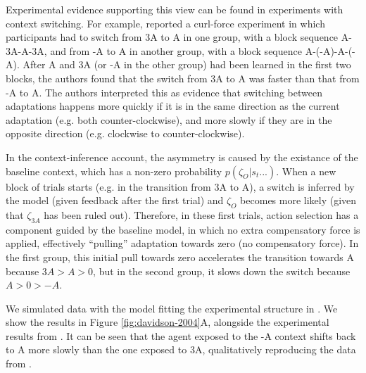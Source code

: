 \documentclass[a4paper,doc,floatsintext,natbib]{apa6}
\def \fref #1{Figure \ref{#1}}     %
\begin{document}
Experimental evidence supporting this view can be found in experiments with context switching. For example, \cite{Davidson_Scaling_2004} reported a curl-force experiment in which participants had to switch from 3A to A in one group, with a block sequence A-3A-A-3A, and from -A to A in another group, with a block sequence A-(-A)-A-(-A). After A and 3A (or -A in the other group) had been learned in the first two blocks, the authors found that the switch from 3A to A was faster than that from -A to A. The authors interpreted this as evidence that switching between adaptations happens more quickly if it is in the same direction as the current adaptation (e.g. both counter-clockwise), and more slowly if they are in the opposite direction (e.g. clockwise to counter-clockwise).

In the context-inference account, the asymmetry is caused by the existance of the baseline context, which has a non-zero probability $p(\zeta_O | s_t ...)$. When a new block of trials starts (e.g. in the transition from 3A to A), a switch is inferred by the model (given feedback after the first trial) and $\zeta_O$ becomes more likely (given that $\zeta_{3A}$ has been ruled out). Therefore, in these first trials, action selection has a component guided by the baseline model, in which no extra compensatory force is applied, effectively ``pulling'' adaptation towards zero (no compensatory force). In the first group, this initial pull towards zero accelerates the transition towards A because $3A > A > 0$, but in the second group, it slows down the switch because $A > 0 > -A$.

We simulated data with the model fitting the experimental structure in \cite{Davidson_Scaling_2004}. We show the results in \fref{fig:davidson-2004}A, alongside the experimental results from \cite{Davidson_Scaling_2004}. It can be seen that the agent exposed to the -A context shifts back to A more slowly than the one exposed to 3A, qualitatively reproducing the data from \cite{Davidson_Scaling_2004}.
\end{document}
